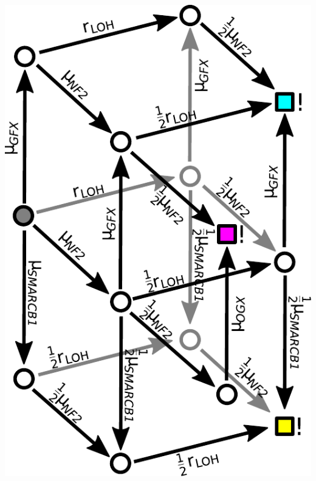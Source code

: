 \documentclass{beamer}
\begin{document}
\begin{frame}
\begin{columns}
\begin{column}{0.5\textwidth}
            \includegraphics[height=0.8\textheight]{figures/vsmodel-nochromosomes.pdf}
        \end{column}
    \end{columns}
\end{frame}
\end{document}
